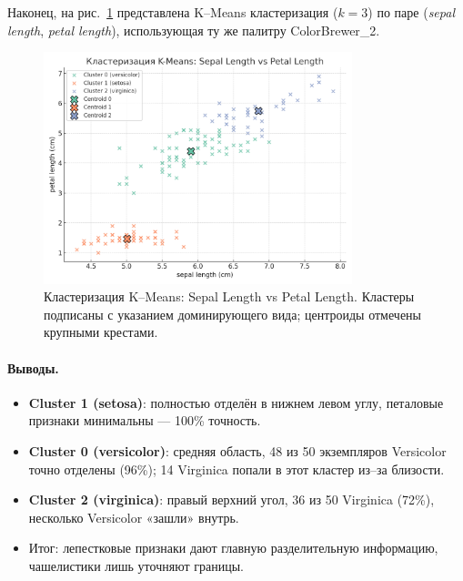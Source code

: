 Наконец, на рис.~\ref{fig:kmeans_cb2} представлена K–Means кластеризация ($k=3$) по паре (\emph{sepal length}, \emph{petal length}), использующая ту же палитру ColorBrewer\_2.

\begin{figure}[ht]
  \centering
  \includegraphics[width=0.8\textwidth]{images/cluster_plot_cb2.png}
  \caption{Кластеризация K–Means: Sepal Length vs Petal Length. Кластеры подписаны с указанием доминирующего вида; центроиды отмечены крупными крестами.}
  \label{fig:kmeans_cb2}
\end{figure}

\paragraph{Выводы.}
\begin{itemize}
  \item \textbf{Cluster 1 (setosa)}: полностью отделён в нижнем левом углу, петаловые признаки минимальны — 100\% точность.
  \item \textbf{Cluster 0 (versicolor)}: средняя область, 48 из 50 экземпляров Versicolor точно отделены (96\%); 14 Virginica попали в этот кластер из–за близости.
  \item \textbf{Cluster 2 (virginica)}: правый верхний угол, 36 из 50 Virginica (72\%), несколько Versicolor «зашли» внутрь.
  \item Итог: лепестковые признаки дают главную разделительную информацию, чашелистики лишь уточняют границы.
\end{itemize}
